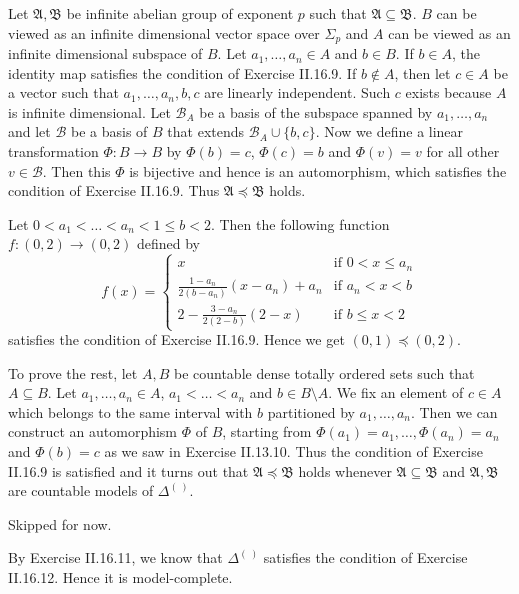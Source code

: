 \documentclass[12pt]{article}
\theoremstyle{definition}
\newenvironment{customthm}[1]
  {\renewcommand\theinnercustomthm{#1}\innercustomthm}
  {\endinnercustomthm}
\begin{document}
\begin{customthm}{II.16.10} Let $\mathfrak{A},\mathfrak{B}$ be infinite abelian group of exponent $p$ such that $\mathfrak{A}\subseteq\mathfrak{B}$. $B$ can be viewed as an infinite dimensional vector space over $\Sigma_p$ and $A$ can be viewed as an infinite dimensional subspace of $B$. Let $a_1,\ldots,a_n\in A$ and $b\in B$. If $b\in A$, the identity map satisfies the condition of Exercise II.16.9. If $b\not\in A$, then let $c\in A$ be a vector such that $a_1,\ldots,a_n,b,c$ are linearly independent. Such $c$ exists because $A$ is infinite dimensional. Let $\mathcal{B}_A$ be a basis of the subspace spanned by $a_1,\ldots,a_n$ and let $\mathcal{B}$ be a basis of $B$ that extends $\mathcal{B}_A\cup\{b,c\}$. Now we define a linear transformation $\Phi:B\rightarrow B$ by $\Phi(b)=c$, $\Phi(c)=b$ and $\Phi(v)=v$ for all other $v\in\mathcal{B}$. Then this $\Phi$ is bijective and hence is an automorphism, which satisfies the condition of Exercise II.16.9. Thus $\mathfrak{A}\preccurlyeq\mathfrak{B}$ holds.
\end{customthm}

\begin{customthm}{II.16.11} Let $0<a_1<\ldots<a_n<1\leq b<2$. Then the following function $f:(0,2)\rightarrow(0,2)$ defined by
\[f(x)=
\begin{cases}
  x & \text{if } 0<x\leq a_n \\
  \frac{1-a_n}{2(b-a_n)}(x-a_n)+a_n & \text{if } a_n<x<b \\
  2-\frac{3-a_n}{2(2-b)}(2-x) & \text{if } b\leq x<2
\end{cases}
\]
satisfies the condition of Exercise II.16.9. Hence we get $(0,1)\preccurlyeq(0,2)$.

To prove the rest, let $A,B$ be countable dense totally ordered sets such that $A\subseteq B$. Let $a_1,\ldots,a_n\in A$, $a_1<\ldots<a_n$ and $b\in B\setminus A$. We fix an element of $c\in A$ which belongs to the same interval with $b$ partitioned by $a_1,\ldots,a_n$. Then we can construct an automorphism $\Phi$ of $B$, starting from $\Phi(a_1)=a_1,\ldots,\Phi(a_n)=a_n$ and $\Phi(b)=c$ as we saw in Exercise II.13.10. Thus the condition of Exercise II.16.9 is satisfied and it turns out that $\mathfrak{A}\preccurlyeq\mathfrak{B}$ holds whenever $\mathfrak{A}\subseteq\mathfrak{B}$ and $\mathfrak{A},\mathfrak{B}$ are countable models of $\Delta^{(~)}$.
\end{customthm}

\begin{customthm}{II.16.12} Skipped for now.
\end{customthm}

\begin{customthm}{II.16.13} By Exercise II.16.11, we know that $\Delta^{(~)}$ satisfies the condition of Exercise II.16.12. Hence it is model-complete.
\end{customthm}
\end{document}
